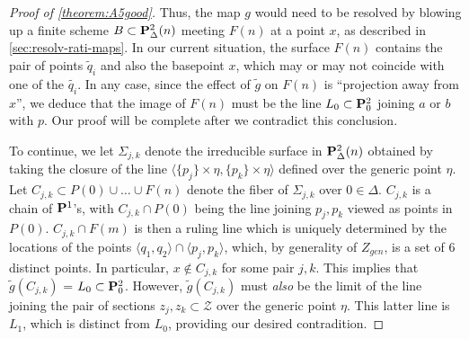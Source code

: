 \documentclass[12pt,reqno]{amsart}
\numberwithin{equation}{section}
\newcommand{\td}{\widetilde}
\begin{document}
\begin{proof}[Proof of \autoref{theorem:A5good}]
  Thus, the map $g$ would need to be resolved by blowing up a finite
  scheme $B \subset \P^{2}_{\Delta}(n)$ meeting $F(n)$ at a point $x$,
  as described in \autoref{sec:resolv-rati-maps}. In our current
  situation, the surface $F(n)$ contains the pair of points
  $\td{q}_{i}$ and also the basepoint $x$, which may or may not
  coincide with one of the $\td{q_{i}}$.  In any case, since the
  effect of $\td{g}$ on $F(n)$ is ``projection away from $x$'', we
  deduce that the image of $F(n)$ must be the line
  $L_0 \subset \P^{2}_{0}$ joining $a$ or $b$ with $p$.  Our proof
  will be complete after we contradict this conclusion.

  
  To continue, we let $\Sigma_{j,k}$ denote the irreducible surface in
  $\P^{2}_{\Delta}(n)$ obtained by taking the closure of the line
  $\langle \{p_{j}\} \times \eta, \{p_{k}\} \times \eta \rangle$
  defined over the generic point $\eta$.  Let
  $C_{j,k} \subset P(0) \cup \dots \cup F(n)$ denote the fiber of
  $\Sigma_{j,k}$ over $0 \in \Delta$. $C_{j,k}$ is a chain of
  $\P^{1}$'s, with $C_{j,k} \cap P(0)$ being the line joining
  $p_{j}, p_{k}$ viewed as points in $P(0)$. $C_{j,k} \cap F(m)$ is
  then a ruling line which is uniquely determined by the locations of
  the points
  $\langle q_{1}, q_{2} \rangle \cap \langle p_{j}, p_{k} \rangle$,
  which, by generality of $Z_{gen}$, is a set of $6$ distinct points.
  In particular, $x \notin C_{j,k}$ for some pair $j,k$.  This implies
  that $\td{g}(C_{j,k})$ = $L_{0} \subset \P^{2}_{0}$.  However,
  $\td{g}(C_{j,k})$ must {\sl also} be the limit of the line joining
  the pair of sections $z_{j}, z_{k} \subset \mathcal{Z}$ over the
  generic point $\eta$.  This latter line is $L_{1}$, which is
  distinct from $L_0$, providing our desired contradition.
\end{proof}





\end{document}
